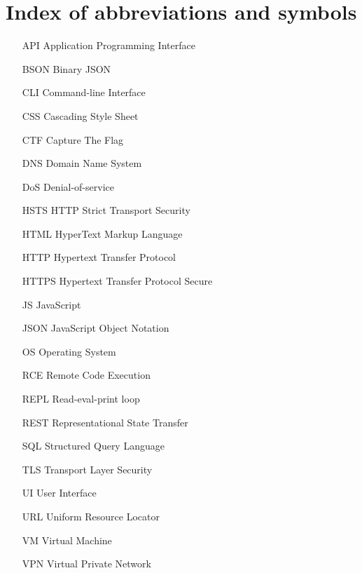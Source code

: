 
\chapter{Index of abbreviations and symbols}

\begin{itemize}
	\item[API] Application Programming Interface
	\item[BSON] Binary JSON
	\item[CLI] Command-line Interface
	\item[CSS] Cascading Style Sheet
	\item[CTF] Capture The Flag
	\item[DNS] Domain Name System
	\item[DoS] Denial-of-service
	\item[HSTS] HTTP Strict Transport Security
	\item[HTML] HyperText Markup Language
	\item[HTTP] Hypertext Transfer Protocol
	\item[HTTPS] Hypertext Transfer Protocol Secure
	\item[JS] JavaScript
	\item[JSON] JavaScript Object Notation
	\item[OS] Operating System
	\item[RCE] Remote Code Execution
	\item[REPL] Read-eval-print loop
	\item[REST] Representational State Transfer
	\item[SQL] Structured Query Language
	\item[TLS] Transport Layer Security
	\item[UI] User Interface
	\item[URL] Uniform Resource Locator
	\item[VM] Virtual Machine
	\item[VPN] Virtual Private Network
\end{itemize}
